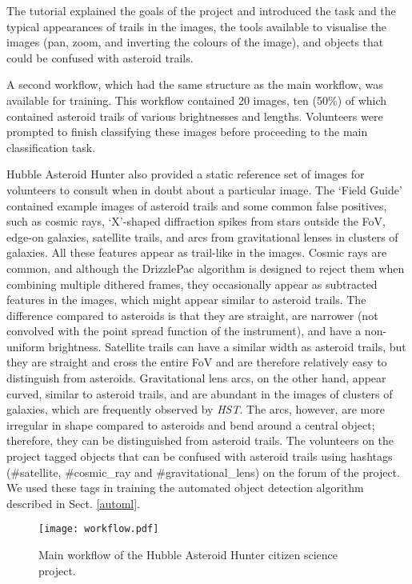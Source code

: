 \documentclass{aa}
\begin{document}
The tutorial explained the goals of the project and introduced the task and the typical appearances of trails in the images, the tools available to visualise the images (pan, zoom, and inverting the colours of the image), and objects that could be confused with asteroid trails. 

A second workflow, which had the same structure as the main workflow, was available for training. This workflow contained 20 images, ten (50\%) of which contained asteroid trails of various brightnesses and lengths. Volunteers were prompted to finish classifying these images before proceeding to the main classification task. 

Hubble Asteroid Hunter also provided a static reference set of images for volunteers to consult when in doubt about a particular image. The `Field Guide' contained example images of asteroid trails and some common false positives, such as cosmic rays, `X'-shaped diffraction spikes from stars outside the FoV, edge-on galaxies, satellite trails, and arcs from gravitational lenses in clusters of galaxies. All these features appear as trail-like in the images. Cosmic rays are common, and although the DrizzlePac algorithm is designed to reject them when combining multiple dithered frames, they occasionally appear as subtracted features in the images, which might appear similar to asteroid trails. The difference compared to asteroids is that they are straight, are narrower (not convolved with the point spread function of the instrument), and have a non-uniform brightness. Satellite trails can have a similar width as asteroid trails, but they are straight and cross the entire FoV and are therefore relatively easy to distinguish from asteroids. Gravitational lens arcs, on the other hand, appear curved, similar to asteroid trails, and are abundant in the images of clusters of galaxies, which are frequently observed by \textit{HST}. The arcs, however, are more irregular in shape compared to asteroids and bend around a central object; therefore, they can be distinguished from asteroid trails. The volunteers on the project tagged objects that can be confused with asteroid trails using hashtags (\#satellite, \#cosmic\_ray and \#gravitational\_lens) on the forum of the project. We used these tags in training the automated object detection algorithm described in Sect. \ref{automl}.

\begin{figure}
   \centering
   \texttt{[image: workflow.pdf]}
   \caption{Main workflow of the Hubble Asteroid Hunter citizen science project.}
    \label{workflow}%
\end{figure}
\end{document}
